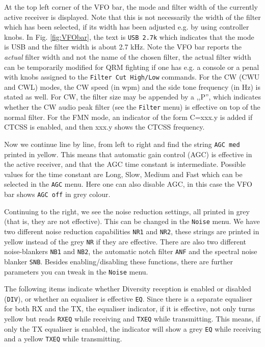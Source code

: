 \documentclass[12pt]{book}
\def\rett#1{\texttt{\color{red}#1}}
\def\bltt#1{\texttt{\color{blue}#1}}
\begin{document}
At the top left  corner of the VFO bar, the mode and
filter width of the currently active receiver is displayed.
Note that this is not necessarily the width of the filter
which has been selected, if its width has been adjusted
e.g. by using controller knobs.
In Fig. \ref{fig:VFObar}, the text is \rett{USB 2.7k}
which indicates that the  mode
is USB and the filter width is about 2.7 kHz.
Note the VFO bar reports the
\textit{actual} filter width and not the name of the chosen filter,
the actual filter width can be temporarily modified for QRM fighting
if one has e.g. a console or a penal with knobs assigned to the \bltt{Filter Cut High/Low}
commands.
For the CW (CWU and CWL) modes, the CW speed (in wpm) and the side tone
frequency (in Hz) is stated as well. For CW, the filter size may be appended
by a ,,P'', which indicates whether the CW audio peak filter (see the
\bltt{Filter} menu) is effective on top of the normal filter.
For the FMN mode, an indicator of the form C=xxx.y is added if
CTCSS is enabled, and then xxx.y shows the CTCSS frequency.

Now we continue line by line, from left to right and find
the string \rett{AGC med} printed in yellow. This means
that automatic gain control (AGC)  is effective  in the
active receiver, and that the AGC time constant is
intermediate. Possible values for the time constant
are Long, Slow, Medium and Fast which can be selected
in the \bltt{AGC} menu. Here one can  also disable AGC,
in this case the VFO bar shows \rett{AGC off} in grey
colour.

Continuing to the right, we see the noise reduction settings,
all printed in grey (that is, they are not effective). This
can be changed in the \bltt{Noise} menu. We have two different
noise reduction capabilities \rett{NR1} and \rett{NR2}, these
strings are printed in yellow instead of the grey \rett{NR} if
they are effective. There are also two different noise-blankers
\rett{NB1} and \rett{NB2}, the automatic notch  filter
\rett{ANF} and the spectral  noise blanker \rett{SNB}.
Besides enabling/disabling these functions, there are  further parameters
you can tweak in the \bltt{Noise} menu.

The following items indicate whether Diversity reception is enabled or disabled
(\rett{DIV}), or whether an equaliser is effective \rett{EQ}.
Since there is a separate equaliser for both RX and the TX,
the equaliser indicator, if it is effective, not only turns yellow
but reads \rett{RXEQ} while receiving and \rett{TXEQ} while
transmitting. This means, if only the TX equaliser is enabled,
the indicator will show a  grey \rett{EQ} while receiving
and a yellow \rett{TXEQ}  while  transmitting.
\end{document}
